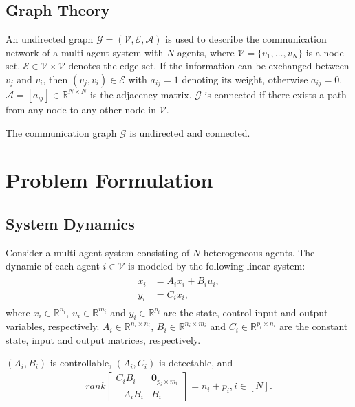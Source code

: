 \documentclass[final,5p,times,twocolumn,authoryear]{elsarticle}
\begin{document}
\subsection{Graph Theory}
	An undirected graph $\mathcal{G} = (\mathcal{V}, \mathcal{E}, \mathcal{A})$ is used to describe the communication network of a multi-agent system with $N$ agents, where $\mathcal{V} = \{v_1, \dots, v_N\}$ is a node set. $\mathcal{E} \in \mathcal{V} \times \mathcal{V}$ denotes the edge set. If the information can be exchanged between $v_j$ and $v_i$, then $(v_j,v_i) \in \mathcal{E}$ with $a_{ij}=1$ denoting its weight, otherwise  $a_{ij}=0$. $\mathcal{A}= [a_{ij}]\in \mathbb{R}^{N \times N}$ is the adjacency matrix. $\mathcal{G}$ is connected if there exists a path from any node to any other node in $\mathcal{V}$.
	
	\begin{assumption} \label{asp1}
		The communication graph $\mathcal{G}$ is undirected and connected.	
	\end{assumption}




\section{Problem Formulation}\label{pro}

\subsection{System Dynamics}

	Consider a multi-agent system consisting of $N$ heterogeneous agents. The dynamic of each agent $i\in\mathcal{V}$ is modeled by the following linear system:
	\begin{align} 
		\begin{split}
			{\dot x}_i&=A_i x_i + B_i u_i,\\
			y_i&=C_i x_i,\label{eqsys}
		\end{split}
	\end{align}
	where $x_i\in\mathbb{R}^{n_i}$, $u_i\in\mathbb{R}^{m_i}$ and $y_i\in\mathbb{R}^{p_i}$ are the state, control input and output variables, respectively. $A_i\in\mathbb{R}^{n_i \times n_i}$, $B_i\in\mathbb{R}^{n_i \times m_i}$ and $C_i\in\mathbb{R}^{p_i \times n_i}$ are the constant state, input and output matrices, respectively.
	
		\begin{assumption} \label{asp4}
		$(A_i,B_i)$ is controllable, $(A_i,C_i)$ is detectable, and
		\begin{align}
			rank \begin{bmatrix} C_iB_i &\boldsymbol{0}_{p_i\times m_i}\\ -A_iB_i &B_i \end{bmatrix}=n_i+p_i, i\in[N].\label{rank1}
		\end{align}
	\end{assumption}
	
\end{document}
